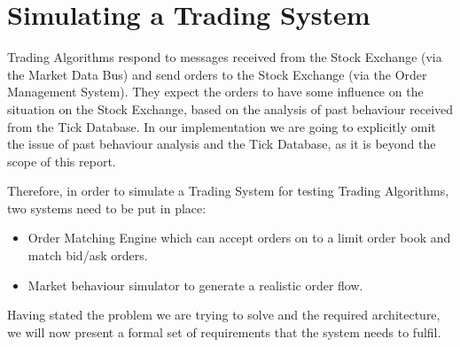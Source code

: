 \section{Simulating a Trading System}

Trading Algorithms respond to messages received from the Stock Exchange (via the Market Data Bus) and send orders to the Stock Exchange (via the Order Management System). They expect the orders to have some influence on the situation on the Stock Exchange, based on the analysis of past behaviour received from the Tick Database. In our implementation we are going to explicitly omit the issue of past behaviour analysis and the Tick Database, as it is beyond the scope of this report. 

Therefore, in order to simulate a Trading System for testing Trading Algorithms, two systems need to be put in place:
\begin{itemize}
\item Order Matching Engine which can accept orders on to a limit order book and match bid/ask orders.
\item Market behaviour simulator to generate a realistic order flow. \end{itemize}

Having stated the problem we are trying to solve and the required architecture, we will now present a formal set of requirements that the system needs to fulfil.
